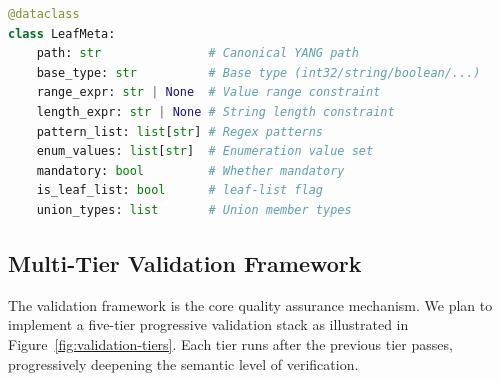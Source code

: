 \documentclass[12pt, a4paper]{article}
\begin{document}
\begin{lstlisting}[language=Python, caption={LeafMeta data structure}]
@dataclass
class LeafMeta:
    path: str               # Canonical YANG path
    base_type: str          # Base type (int32/string/boolean/...)
    range_expr: str | None  # Value range constraint
    length_expr: str | None # String length constraint
    pattern_list: list[str] # Regex patterns
    enum_values: list[str]  # Enumeration value set
    mandatory: bool         # Whether mandatory
    is_leaf_list: bool      # leaf-list flag
    union_types: list       # Union member types
\end{lstlisting}

\subsection{Multi-Tier Validation Framework}
\label{sec:validation}

The validation framework is the core quality assurance mechanism. We plan to implement a five-tier progressive validation stack as illustrated in Figure~\ref{fig:validation-tiers}. Each tier runs after the previous tier passes, progressively deepening the semantic level of verification.
\end{document}
